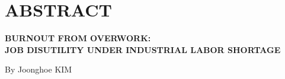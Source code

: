 \documentclass[
  12pt,
]{article}
\begin{document}
\section*{ABSTRACT}\label{abstract}

\thispagestyle{empty}

\begin{center}

\vspace{1em}

\textbf{BURNOUT FROM OVERWORK:} \\
\textbf{JOB DISUTILITY UNDER INDUSTRIAL LABOR SHORTAGE}

\vspace{1em}

By Joonghoe KIM
\end{center}

\vspace{2em}

\setlength{\parindent}{0pt}
\end{document}
